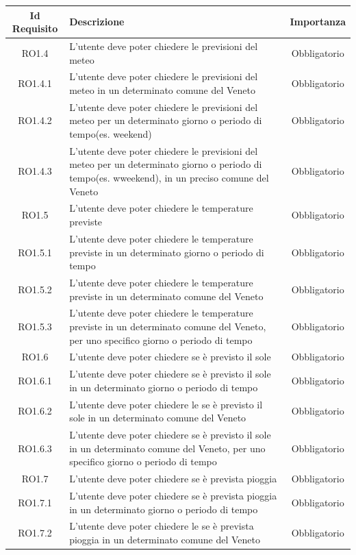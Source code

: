 \normalsize
\begin{longtable}{|c|>{\centering}m{7cm}|c|}
\hline
\textbf{Id Requisito} & \textbf{Descrizione} & \textbf{Importanza}\\
\hline
\endhead
RO1.4 & L'utente deve poter chiedere le previsioni del meteo & Obbligatorio\\ 
RO1.4.1 & L'utente deve poter chiedere le previsioni del meteo in un determinato comune del Veneto & Obbligatorio\\
RO1.4.2 & L'utente deve poter chiedere le previsioni del meteo per un determinato giorno o periodo di tempo(es. weekend) & Obbligatorio\\  
RO1.4.3 & L'utente deve poter chiedere le previsioni del meteo per un determinato giorno o periodo di tempo(es. wweekend), in un preciso comune del Veneto & Obbligatorio\\ 
RO1.5 & L'utente deve poter chiedere le temperature previste & Obbligatorio\\ 
RO1.5.1 & L'utente deve poter chiedere le temperature previste in un determinato giorno o periodo di tempo & Obbligatorio\\
RO1.5.2 & L'utente deve poter chiedere le temperature previste in un determinato comune del Veneto & Obbligatorio\\  
RO1.5.3 & L'utente deve poter chiedere le temperature previste in un determinato comune del Veneto, per uno specifico giorno o periodo di tempo & Obbligatorio\\ 
RO1.6 & L'utente deve poter chiedere se è previsto il sole & Obbligatorio\\ 
RO1.6.1 & L'utente deve poter chiedere se è previsto il sole in un determinato giorno o periodo di tempo & Obbligatorio\\
RO1.6.2 & L'utente deve poter chiedere le se è previsto il sole in un determinato comune del Veneto & Obbligatorio\\  
RO1.6.3 & L'utente deve poter chiedere se è previsto il sole in un determinato comune del Veneto, per uno specifico giorno o periodo di tempo & Obbligatorio\\  
RO1.7 & L'utente deve poter chiedere se è prevista pioggia & Obbligatorio\\ 
RO1.7.1 & L'utente deve poter chiedere se è prevista pioggia in un determinato giorno o periodo di tempo & Obbligatorio\\
RO1.7.2 & L'utente deve poter chiedere le se è prevista pioggia in un determinato comune del Veneto & Obbligatorio\\  

\end{longtable}
